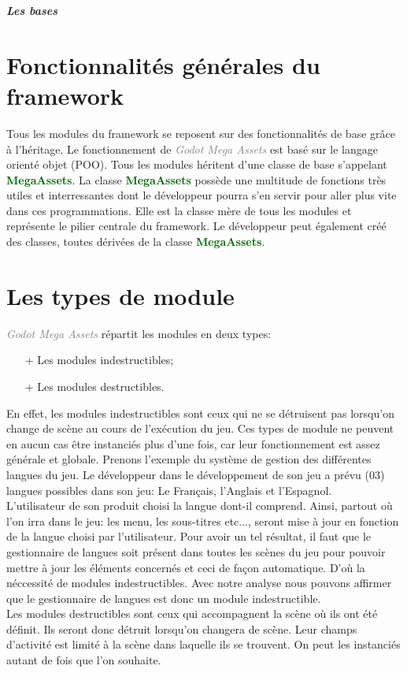 \documentclass[a4paper, 11pt]{article}
\begin{document}
	\pagecolor{silver}
	\huge{\hspace{15.5cm}\textit{\textbf{Les bases}}}\large{} \tableofcontents \listoffigures \newpage
	\section{Fonctionnalités générales du framework}
	Tous les modules du framework se reposent sur des fonctionnalités de base grâce à l'héritage. Le 
	fonctionnement de \textcolor{gray}{\textit{Godot Mega Assets}} est basé sur le langage orienté objet 
	(POO). Tous les modules héritent d'une classe de base s'appelant \textcolor{darkgreen}
	{\textbf{MegaAssets}}. La classe \textcolor{darkgreen}{\textbf{MegaAssets}} possède une multitude de 
	fonctions très utiles et interressantes dont le développeur pourra s'en servir pour aller plus vite dans 
	ces programmations. Elle est la classe mère de tous les modules et représente le pilier centrale du 
	framework. Le développeur peut également créé des classes, toutes dérivées de la classe 
	\textcolor{darkgreen}{\textbf{MegaAssets}}.
	\section{Les types de module}
	\textcolor{gray}{\textit{Godot Mega Assets}} répartit les modules en deux types:
	\begin{itemize}
		\item[+] Les modules indestructibles;
		\item[+] Les modules destructibles.
	\end{itemize}
	En effet, les modules indestructibles sont ceux qui ne se détruisent pas lorsqu'on change de scène au 
	cours de l'exécution du jeu. Ces types de module ne peuvent en aucun cas être instanciés plus d'une 
	fois, car leur fonctionnement est assez générale et globale. Prenons l'exemple du système de gestion des 
	différentes langues du jeu. Le développeur dans le développement de son jeu a prévu (03) langues 
	possibles dans son jeu: Le Français, l'Anglais et l'Espagnol.\\
	L'utilisateur de son produit choisi la langue dont-il comprend. Ainsi, partout où l'on irra dans le jeu: 
	les menu, les sous-titres etc..., seront mise à jour en fonction de la langue choisi par l'utilisateur. 
	Pour avoir un tel résultat, il faut que le gestionnaire de langues soit présent dans toutes les scènes 
	du jeu pour pouvoir mettre à jour les éléments concernés et ceci de façon automatique. D'où la 
	néccessité de modules indestructibles. Avec notre analyse nous pouvons affirmer que le gestionnaire de 
	langues est donc un module indestructible.\\
	Les modules destructibles sont ceux qui accompagnent la scène où ils ont été définit. Ils seront donc
	détruit lorsqu'on changera de scène. Leur champs d'activité est limité à la scène dans laquelle ils se 
	trouvent. On peut les instanciés autant de fois que l'on souhaite.
\end{document}
